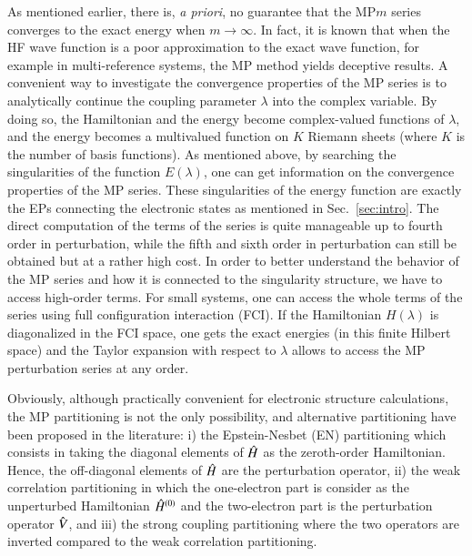 \documentclass[aps,prb,reprint,noshowkeys,superscriptaddress]{revtex4-1}
\newcommand{\hH}{\Hat{H}}
\newcommand{\hV}{\Hat{V}}
\begin{document}
As mentioned earlier, there is, \textit{a priori}, no guarantee that the MP$m$ series converges to the exact energy when $m \to \infty$. 
In fact, it is known that when the HF wave function is a poor approximation to the exact wave function, for example in multi-reference systems, the MP method yields deceptive results. \cite{Gill_1986, Gill_1988, Handy_1985, Lepetit_1988}
A convenient way to investigate the convergence properties of the MP series is to analytically continue the coupling parameter $\lambda$ into the complex variable. 
By doing so, the Hamiltonian and the energy become complex-valued functions of $\lambda$, and the energy becomes a multivalued function on $K$ Riemann sheets (where $K$ is the number of basis functions).
As mentioned above, by searching the singularities of the function $E(\lambda)$, one can get information on the convergence properties of the MP series. 
These singularities of the energy function are exactly the EPs connecting the electronic states as mentioned in Sec.~\ref{sec:intro}. 
The direct computation of the terms of the series is quite manageable up to fourth order in perturbation, while the fifth and sixth order in perturbation can still be obtained but at a rather high cost. \cite{JensenBook}
In order to better understand the behavior of the MP series and how it is connected to the singularity structure, we have to access high-order terms. 
For small systems, one can access the whole terms of the series using full configuration interaction (FCI). 
If the Hamiltonian $H(\lambda)$ is diagonalized in the FCI space, one gets the exact energies (in this finite Hilbert space) and the Taylor expansion with respect to $\lambda$ allows to access the MP perturbation series at any order.

Obviously, although practically convenient for electronic structure calculations, the MP partitioning is not the only possibility, and alternative partitioning have been proposed in the literature:
i) the Epstein-Nesbet (EN) partitioning which consists in taking the diagonal elements of $\hH$ as the zeroth-order Hamiltonian. \cite{Nesbet_1955,Epstein_1926} 
Hence, the off-diagonal elements of $\hH$ are the perturbation operator,
ii) the weak correlation partitioning in which the one-electron part is consider as the unperturbed Hamiltonian $\hH^{(0)}$ and the two-electron part is the perturbation operator $\hV$, and 
iii) the strong coupling partitioning where the two operators are inverted compared to the weak correlation partitioning. \cite{Seidl_2018}

\end{document}
